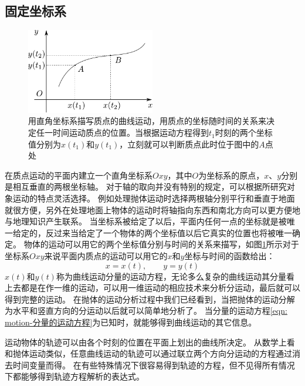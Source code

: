 \subsection{固定坐标系}
\begin{figure}[hbtp]
\centering
\includegraphics[width=0.5\textwidth]{images/motion-18.pdf}
\caption{用直角坐标系描写质点的曲线运动，用质点的坐标随时间的关系来决定任一时间运动质点的位置。当根据运动方程得到$t_1$时刻的两个坐标值分别为$x(t_1)$和$y(t_1)$，立刻就可以判断质点此时位于图中的$A$点处}\label{fig: motion-曲线运动的直角坐标系描写}
\end{figure}

在质点运动的平面内建立一个直角坐标系$Oxy$，其中$O$为坐标系的原点，$x、y$分别是相互垂直的两根坐标轴。
对于轴的取向并没有特别的规定，可以根据所研究对象运动的特点灵活选择。
例如处理抛体运动时选择两根轴分别平行和垂直于地面就很方便，另外在处理地面上物体的运动时将轴指向东西和南北方向可以更方便地与地理知识产生联系。
当坐标系被给定了以后，平面内任何一点的坐标就是被唯一给定的，反过来当给定了一个物体的两个坐标值以后它真实的位置也将被唯一确定。
物体的运动可以用它的两个坐标值分别与时间的关系来描写，如图\ref{fig: motion-曲线运动的直角坐标系描写}所示对于坐标系$Oxy$来说平面内质点的运动可以用它的$x$和$y$坐标与时间的函数给出：
\begin{equation}\label{eqn: motion-分量的运动方程}
x = x(t),\qquad y = y(t)
\end{equation}
$x(t)$和$y(t)$称为曲线运动分量的运动方程，无论多么复杂的曲线运动其分量看上去都是在作一维的运动，可以用一维运动的相应技术来分析分运动，最后就可以得到完整的运动。
在抛体的运动分析过程中我们已经看到，当把抛体的运动分解为水平和竖直方向的分运动以后就可以简单地分析了。
当分量的运动方程\ref{eqn: motion-分量的运动方程}为已知时，就能够得到曲线运动的其它信息。

运动物体的轨迹可以由各个时刻的位置在平面上划出的曲线所决定。
从数学上看和抛体运动类似，任意曲线运动的轨迹可以通过联立两个方向分运动的方程通过消去时间变量而得。
在有些特殊情况下很容易得到轨迹的方程，但不见得所有情况下都能够得到轨迹方程解析的表达式。



